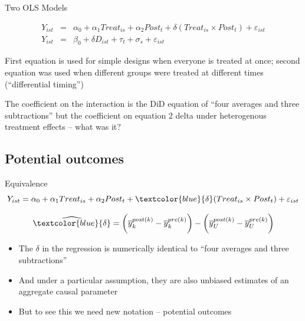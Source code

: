 \documentclass{beamer}
\begin{document}
\begin{frame}{Two OLS Models}

\begin{eqnarray}
Y_{ist} &=& \alpha_0 + \alpha_1 Treat_{is} + \alpha_2 Post_{t} + \delta (Treat_{is} \times Post_t) + \varepsilon_{ist} \\
Y_{ist} &=& \beta_0 + \delta D_{ist} + \tau_t + \sigma_s + \varepsilon_{ist}
\end{eqnarray}

\bigskip

First equation is used for simple designs when everyone is treated at once; second equation was used when different groups were treated at different times (``differential timing'')

\bigskip

The coefficient on the interaction is the DiD equation of ``four averages and three subtractions'' but the coefficient on equation 2 delta under heterogenous treatment effects -- what was it?

\end{frame}


\subsection{Potential outcomes}

\begin{frame}{Equivalence}
$$Y_{ist} = \alpha_0 + \alpha_1 Treat_{is} + \alpha_2 Post_{t} + \textcolor{blue}{\delta} (Treat_{is} \times Post_t) + \varepsilon_{ist} $$

\bigskip

$$\widehat{\textcolor{blue}{\delta}} = \bigg ( \overline{y}_k^{post(k)} - \overline{y}_k^{pre(k)} \bigg ) - \bigg ( \overline{y}_U^{post(k)} - \overline{y}_U^{pre(k)} \bigg ) $$

\begin{itemize}
\item The $\delta$ in the regression is numerically identical to ``four averages and three subtractions'' 
\item And under a particular assumption, they are also unbiased estimates of an aggregate causal parameter
\item But to see this we need new notation -- potential outcomes
\end{itemize}

\end{frame}
\end{document}
